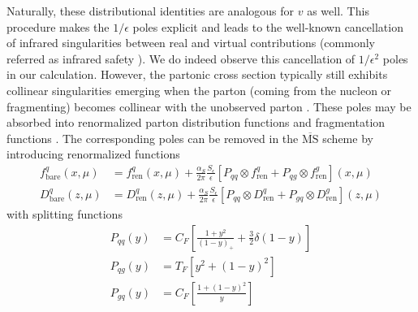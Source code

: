 Naturally, these distributional identities are analogous for $v$ as well. %
This procedure makes the $1/\epsilon$ poles explicit and leads to the well-known cancellation of infrared singularities between real and virtual contributions (commonly referred as infrared safety \cite{kinoshita_mass_1962}). We do indeed observe this cancellation of $1/\epsilon^2$ poles in our calculation. However, the partonic cross section typically still exhibits collinear singularities emerging when the parton (coming from the nucleon or fragmenting) becomes collinear with the unobserved parton \cite{hinderer_single-inclusive_2015}. These poles may be absorbed into renormalized parton distribution functions and fragmentation functions \cite{altarelli_large_1979, Collins_2011}. The corresponding poles can be removed in the $\overline{\text{MS}}$ scheme by introducing renormalized functions
\begin{equation}
\begin{aligned}
    f^q_{\text{bare}}(x,\mu)&= f^q_{\text{ren}}(x,\mu)+\frac{\alpha_S}{2\pi}\frac{S_\epsilon}{\epsilon}\left[P_{qq} \otimes f^q_{\text{ren}}+P_{qg} \otimes f^g_{\text{ren}}\right](x,\mu)\\
    D^q_{\text{bare}}(z,\mu)&= D^q_{\text{ren}}(z,\mu)+\frac{\alpha_S}{2\pi}\frac{S_\epsilon}{\epsilon}\left[P_{qq} \otimes D^q_{\text{ren}}+P_{gq} \otimes D^g_{\text{ren}}\right](z,\mu)
\end{aligned}
\end{equation}
with splitting functions
\begin{equation}
    \begin{aligned}
        P_{qq}(y)&=C_F\left[\frac{1+y^2}{(1-y)_+}+\frac{3}{2}\delta(1-y)\right]\\
        P_{qg}(y)&=T_F\left[y^2+(1-y)^2\right]\\
        P_{gq}(y)&=C_F\left[\frac{1+(1-y)^2}{y}\right]
    \end{aligned}
\end{equation}
